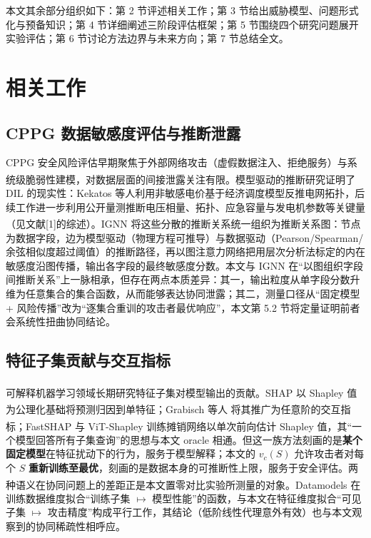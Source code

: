 \documentclass[10.5pt,compsoc,UTF8]{CjC}
\theoremstyle{mystyle}
\newcommand{\upcite}[1]{\textsuperscript{\cite{#1}}}
\begin{document}
本文其余部分组织如下：第 2 节评述相关工作；第 3 节给出威胁模型、问题形式化与预备知识；第 4 节详细阐述三阶段评估框架；第 5 节围绕四个研究问题展开实验评估；第 6 节讨论方法边界与未来方向；第 7 节总结全文。

\section{\heiti 相关工作}

\subsection{CPPG 数据敏感度评估与推断泄露}

CPPG 安全风险评估早期聚焦于外部网络攻击（虚假数据注入、拒绝服务）与系统级脆弱性建模，对数据层面的间接泄露关注有限\upcite{hu2026ignn}。模型驱动的推断研究证明了 DIL 的现实性：Kekatos 等人利用非敏感电价基于经济调度模型反推电网拓扑，后续工作进一步利用公开量测推断电压相量、拓扑、应急容量与发电机参数等关键量（见文献[1]的综述）。IGNN\upcite{hu2026ignn} 将这些分散的推断关系统一组织为推断关系图：节点为数据字段，边为模型驱动（物理方程可推导）与数据驱动（Pearson/Spearman/余弦相似度超过阈值）的推断路径，再以图注意力网络把用层次分析法标定的内在敏感度沿图传播，输出各字段的最终敏感度分数。本文与 IGNN 在“以图组织字段间推断关系”上一脉相承，但存在两点本质差异：其一，输出粒度从单字段分数升维为任意集合的集合函数，从而能够表达协同泄露；其二，测量口径从“固定模型 + 风险传播”改为“逐集合重训的攻击者最优响应”，本文第 5.2 节将定量证明前者会系统性扭曲协同结论。

\subsection{特征子集贡献与交互指标}

可解释机器学习领域长期研究特征子集对模型输出的贡献。SHAP\upcite{lundberg2017shap} 以 Shapley 值为公理化基础将预测归因到单特征；Grabisch 等人\upcite{grabisch1999interaction} 将其推广为任意阶的交互指标；FastSHAP\upcite{jethani2022fastshap} 与 ViT-Shapley\upcite{covert2023vitshapley} 训练摊销网络以单次前向估计 Shapley 值，其“一个模型回答所有子集查询”的思想与本文 oracle 相通。但这一族方法刻画的是\textbf{某个固定模型}在特征扰动下的行为，服务于模型解释；本文的 $v_c(S)$ 允许攻击者对每个 $S$ \textbf{重新训练至最优}，刻画的是数据本身的可推断性上限，服务于安全评估。两种语义在协同问题上的差距正是本文置零对比实验所测量的对象。Datamodels\upcite{ilyas2022datamodels} 在训练数据维度拟合“训练子集 $\mapsto$ 模型性能”的函数，与本文在特征维度拟合“可见子集 $\mapsto$ 攻击精度”构成平行工作，其结论（低阶线性代理意外有效）也与本文观察到的协同稀疏性相呼应。
\end{document}
